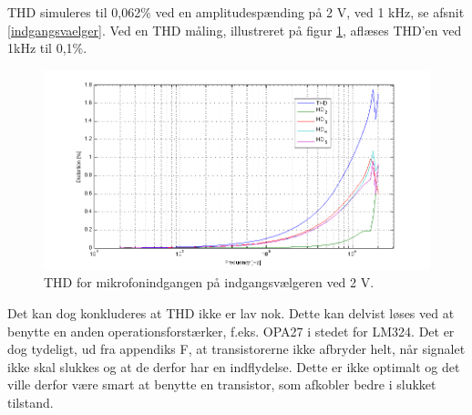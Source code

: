 THD simuleres til 0,062\% ved en amplitudespænding på 2 V, ved 1 kHz, se afsnit \ref{indgangsvaelger}. Ved en THD måling, illustreret på figur \ref{fig:accind:thd2v}, aflæses THD'en ved 1kHz til 0,1\%. 
\begin{figure}[h]
\centering
\includegraphics[width=\textwidth]{maalerapporter/indgangsvaelger/Indgangsvlger mic 2v thd.png}
\caption{THD for mikrofonindgangen på indgangsvælgeren ved 2 V.}
\label{fig:accind:thd2v}
\end{figure}
Det kan dog konkluderes at THD ikke er lav nok. Dette kan delvist løses ved at benytte en anden operationsforstærker, f.eks. OPA27 i stedet for LM324. Det er dog tydeligt, ud fra appendiks F, at transistorerne ikke afbryder helt, når signalet ikke skal slukkes og at de derfor har en indflydelse. Dette er ikke optimalt og det ville derfor være smart at benytte en transistor, som afkobler bedre i slukket tilstand.